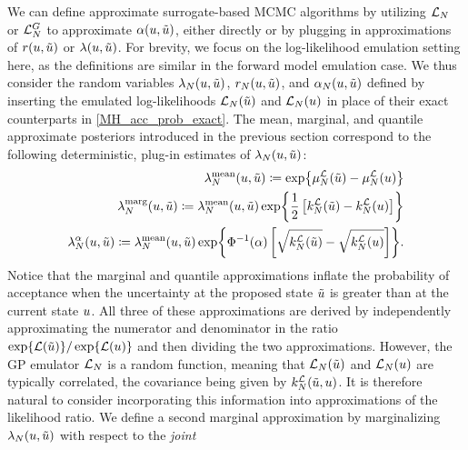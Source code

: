 \documentclass[12pt]{article}
\begin{document}
We can define approximate surrogate-based MCMC algorithms by utilizing $\llikEm[\Ndesign]$ 
or $\llikEmFwd[\Ndesign]$ to approximate $\accProbMH(\Par, \propPar)$, either directly or by plugging 
in approximations of $\accProbRatio(\Par, \propPar)$ or $\likRatio(\Par, \propPar)$.  
For brevity, we focus on the log-likelihood emulation setting here, as the definitions are similar in the forward 
model emulation case. 
We thus consider the random variables $\Em[\Ndesign]{\likRatio}(\Par, \propPar)$,
$\Em[\Ndesign]{\accProbRatio}(\Par, \propPar)$, and 
$\Em[\Ndesign]{\accProbMH}(\Par, \propPar)$ defined by inserting the emulated log-likelihoods 
$\llikEm[\Ndesign](\propPar)$ and $\llikEm[\Ndesign](\Par)$ in place of their exact counterparts
in \ref{MH_acc_prob_exact}. The mean, marginal, and quantile approximate posteriors introduced in the previous 
section correspond to the following deterministic, plug-in estimates of $\Em[\Ndesign]{\likRatio}(\Par, \propPar)$:
\begin{align}
\llikEmMean[\Ndesign]{\likRatio}(\Par, \propPar) 
\coloneqq \Exp{\emMean[\Ndesign]{\llik}(\propPar) - \emMean[\Ndesign]{\llik}(\Par)} \\
\llikEmMarg[\Ndesign]{\likRatio}(\Par, \propPar) 
\Def \llikEmMean[\Ndesign]{\likRatio}(\Par, \propPar) 
\Exp{\frac{1}{2}\left[\emKer[\Ndesign]{\llik}(\propPar) - \emKer[\Ndesign]{\llik}(\Par)\right]} \\
\llikEmQ[\Ndesign]{\likRatio}(\Par, \propPar) 
\Def \llikEmMean[\Ndesign]{\likRatio}(\Par, \propPar) 
\Exp{\GaussianCDF^{-1}(\quantileProb)  \left[\sqrt{\emKer[\Ndesign]{\llik}(\propPar)} - \sqrt{\emKer[\Ndesign]{\llik}(\Par)}\right]}.
\end{align}
Notice that the marginal and quantile approximations inflate the probability of acceptance when the 
uncertainty at the proposed state $\propPar$ is greater than at the current state $\Par$.
All three of these approximations are derived by independently approximating the numerator and denominator 
in the ratio $\Exp{\llik(\propPar)} / \Exp{\llik(\Par)}$ and then dividing the two approximations.
However, the GP emulator $\llikEm[\Ndesign]$ is a random function, meaning that 
$\llikEm[\Ndesign](\propPar)$ and $\llikEm[\Ndesign](\Par)$ are typically correlated, the covariance
being given by $\emKer[\Ndesign]{\llik}(\propPar, \Par)$. It is therefore natural to consider incorporating 
this information into approximations of the likelihood ratio. We define a second marginal approximation 
by marginalizing $\Em[\Ndesign]{\likRatio}(\Par, \propPar)$ with respect to the \textit{joint} 
\end{document}
